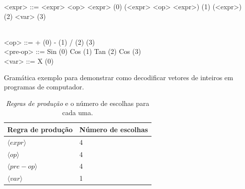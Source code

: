 \begin{Grammar}
	\begin{grammar}
		
		
		<expr> ::=  <expr> <op> <expr> \hspace{10cm} (0) 
		\alt (<expr> <op> <expr>) \hspace{9.7cm} (1)  
		\alt <pre-op> (<expr>) \hspace{10.15cm} (2)  \hspace{12.1cm} (3) \\\
		
		<op> ::=  + \hspace{12.7cm} (0)   \alt - \hspace{12.8cm} (1)  \alt  /  \hspace{12.85cm} (2) \alt * \hspace{12.75cm} (3) \\
		
		<pre-op> ::= Sin  \hspace{12.4cm} (0) \alt Cos
		\hspace{12.3cm} (1) \alt Tan  \hspace{12.35cm} (2) \alt Cos \hspace{12.3cm} (3) \\
		
		<var> ::= X  \hspace{12.6cm} (0)
		
		
	\end{grammar}
	
	\caption{Gramática exemplo para demonstrar como decodificar vetores de inteiros em programas de computador.}
	\label{gram:gramatica}
\end{Grammar}


\begin{table}[htb]
	\centering
	\caption{\textit{Regras de produção} e o número de escolhas para cada uma.}
	\label{tab:productionRules}
	\begin{tabular}{|l|l|}
		\hline
		Regra de produção & Número de escolhas \\ \hline
		$\langle expr \rangle$                        & 4       \\ \hline
		$\langle op \rangle$                         & 4       \\ \hline
		$\langle pre-op \rangle$                         & 4       \\ \hline
		$\langle var \rangle$                          & 1       \\ \hline
	\end{tabular}
\end{table}


